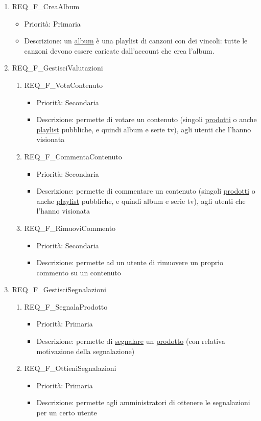 \begin{enumerate}
	\item REQ\_F\_CreaAlbum
		\begin{itemize}	
		\item Priorità: Primaria
		\item Descrizione: un \hyperlink{AnReqAlbum}{album} è una playlist di canzoni con dei vincoli: tutte le canzoni devono essere caricate dall'account che crea l'album.
		\end{itemize}

	\item REQ\_F\_GestisciValutazioni
		\begin{enumerate}[label*=\arabic*.]
		\item REQ\_F\_VotaContenuto
			\begin{itemize}	
			\item Priorità: Secondaria
			\item Descrizione: permette di votare un contenuto (singoli \hyperlink{AnReqProdMult}{prodotti} o anche \hyperlink{AnReqPlaylist}{playlist} pubbliche, e quindi album e serie tv), agli utenti che l'hanno visionata
			\end{itemize}
		
		\item REQ\_F\_CommentaContenuto
			\begin{itemize}	
			\item Priorità: Secondaria
			\item Descrizione: permette di commentare un contenuto (singoli \hyperlink{AnReqProdMult}{prodotti} o anche \hyperlink{AnReqPlaylist}{playlist} pubbliche, e quindi album e serie tv), agli utenti che l'hanno visionata
			\end{itemize}
		\item REQ\_F\_RimuoviCommento
			\begin{itemize}	
			\item Priorità: Secondaria
			\item Descrizione: permette ad un utente di rimuovere un proprio commento su un contenuto
			\end{itemize}
		\end{enumerate}
	
	\item REQ\_F\_GestisciSegnalazioni
		\begin{enumerate}[label*=\arabic*.]
		\item REQ\_F\_SegnalaProdotto
			\begin{itemize}
			\item Priorità: Primaria		
			\item Descrizione: permette di \hyperlink{AnReqSegnalazioni}{segnalare} un \hyperlink{AnReqProdMult}{prodotto} (con relativa motivazione della segnalazione)
			\end{itemize}
		\item REQ\_F\_OttieniSegnalazioni
			\begin{itemize}	
			\item Priorità: Primaria
			\item Descrizione: permette agli amministratori di ottenere le segnalazioni per un certo utente
			\end{itemize}
		\end{enumerate}


\end{enumerate}
